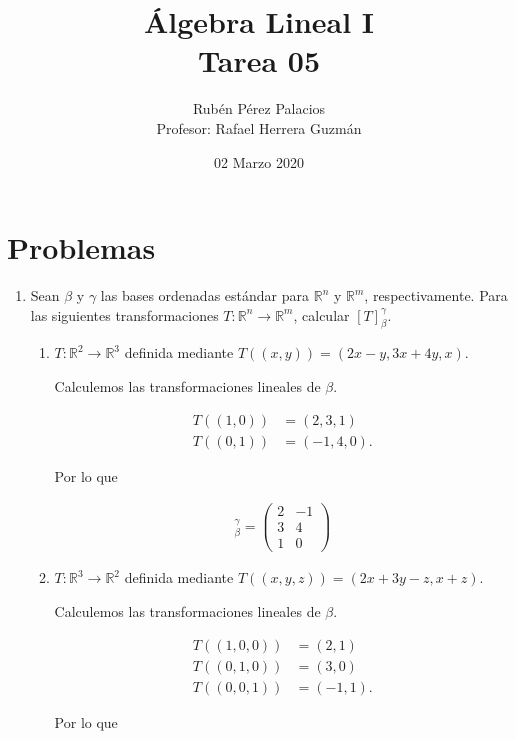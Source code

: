 \documentclass[10pt,a4paper]{article}
\title{Álgebra Lineal I\\Tarea 05}
\author{Rubén Pérez Palacios\\Profesor: Rafael Herrera Guzmán}
\date{02 Marzo 2020}
\theoremstyle{definition}
\newcommand{\R}{\mathbb{R}}
\begin{document}
\maketitle

\section*{Problemas}

\begin{enumerate}
    \item Sean $\beta$ y $\gamma$ las bases ordenadas estándar para $\R^n$ y $\R^m$, respectivamente. Para las siguientes transformaciones $T : \R^n \rightarrow \R^m$, calcular $[T]^\gamma_\beta$.
    
    \begin{enumerate}
        \item $T: \R^2 \rightarrow \R^3$ definida mediante $T((x,y)) = (2x-y,3x+4y,x)$.
        
        Calculemos las transformaciones lineales de $\beta$.

        \begin{align*}
            T((1,0)) &= (2,3,1)\\
            T((0,1)) &= (-1,4,0).
        \end{align*}
        
        Por lo que

        \begin{align*}
            [T]^\gamma_\beta = \begin{pmatrix}
                2 & -1\\
                3 & 4\\
                1 & 0
            \end{pmatrix}
        \end{align*}

        \item $T: \R^3 \rightarrow \R^2$ definida mediante $T((x,y,z)) = (2x+3y-z,x+z)$.
        
        Calculemos las transformaciones lineales de $\beta$.

        \begin{align*}
            T((1,0,0)) &= (2,1)\\
            T((0,1,0)) &= (3,0)\\
            T((0,0,1)) &= (-1,1).
        \end{align*}
        
        Por lo que


\end{enumerate}
\end{enumerate}
\end{document}
